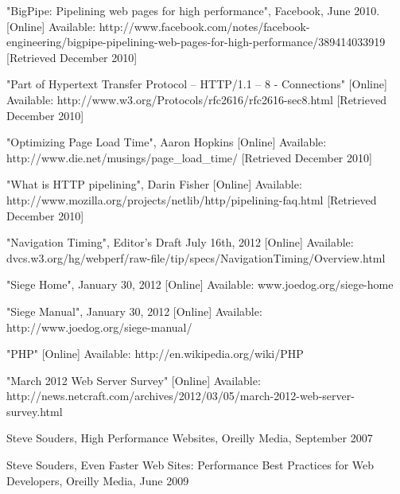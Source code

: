 \documentclass[12pt]{report}
\begin{document}
\begin{thebibliography}{2}

"BigPipe: Pipelining web pages for high performance", Facebook, June 2010. [Online]
Available: http://www.facebook.com/notes/facebook-engineering/bigpipe-pipelining-web-pages-for-high-performance/389414033919 [Retrieved December 2010]

"Part of Hypertext Transfer Protocol -- HTTP/1.1 – 8 - Connections" [Online]
Available: http://www.w3.org/Protocols/rfc2616/rfc2616-sec8.html [Retrieved December 2010]

"Optimizing Page Load Time", Aaron Hopkins [Online]
Available: http://www.die.net/musings/page\_load\_time/ [Retrieved December 2010]

"What is HTTP pipelining", Darin Fisher [Online]
Available: http://www.mozilla.org/projects/netlib/http/pipelining-faq.html [Retrieved December 2010]

"Navigation Timing", Editor's Draft July 16th, 2012 [Online]
Available: dvcs.w3.org/hg/webperf/raw-file/tip/specs/NavigationTiming/Overview.html

"Siege Home",  January 30, 2012 [Online]
Available: www.joedog.org/siege-home

"Siege Manual", January 30, 2012 [Online]
Available: http://www.joedog.org/siege-manual/

"PHP" [Online]
Available: http://en.wikipedia.org/wiki/PHP

"March 2012 Web Server Survey" [Online]
Available: http://news.netcraft.com/archives/2012/03/05/march-2012-web-server-survey.html

Steve Souders, High Performance Websites, Oreilly Media, September 2007

Steve Souders, Even Faster Web Sites: Performance Best Practices for Web Developers, Oreilly Media, June 2009

\end{thebibliography}
\end{document}

